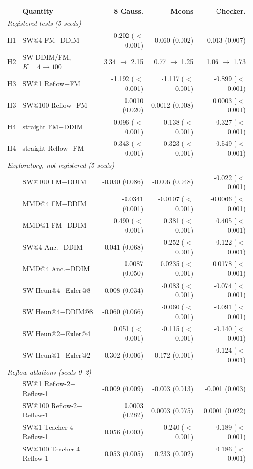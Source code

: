 \begin{tabular}{llrrr}
\toprule
 & Quantity & 8 Gauss. & Moons & Checker. \\
\midrule
\multicolumn{5}{l}{\emph{Registered tests (5 seeds)}} \\
H1 & SW@4 FM$-$DDIM & -0.202 ($<$0.001) & 0.060 (0.002) & -0.013 (0.007) \\
H2 & SW DDIM/FM, $K{=}4\to100$ & 3.34 $\to$ 2.15 & 0.77 $\to$ 1.25 & 1.06 $\to$ 1.73 \\
H3 & SW@1 Reflow$-$FM & -1.192 ($<$0.001) & -1.117 ($<$0.001) & -0.899 ($<$0.001) \\
H3 & SW@100 Reflow$-$FM & 0.0010 (0.020) & 0.0012 (0.008) & 0.0003 ($<$0.001) \\
H4 & straight FM$-$DDIM & -0.096 ($<$0.001) & -0.138 ($<$0.001) & -0.327 ($<$0.001) \\
H4 & straight Reflow$-$FM & 0.343 ($<$0.001) & 0.323 ($<$0.001) & 0.549 ($<$0.001) \\
\midrule
\multicolumn{5}{l}{\emph{Exploratory, not registered (5 seeds)}} \\
 & SW@100 FM$-$DDIM & -0.030 (0.086) & -0.006 (0.048) & -0.022 ($<$0.001) \\
 & MMD@4 FM$-$DDIM & -0.0341 (0.001) & -0.0107 ($<$0.001) & -0.0066 ($<$0.001) \\
 & MMD@1 FM$-$DDIM & 0.490 ($<$0.001) & 0.381 ($<$0.001) & 0.405 ($<$0.001) \\
 & SW@4 Anc.$-$DDIM & 0.041 (0.068) & 0.252 ($<$0.001) & 0.122 ($<$0.001) \\
 & MMD@4 Anc.$-$DDIM & 0.0087 (0.050) & 0.0235 ($<$0.001) & 0.0178 ($<$0.001) \\
 & SW Heun@4$-$Euler@8 & -0.008 (0.034) & -0.083 ($<$0.001) & -0.074 ($<$0.001) \\
 & SW Heun@4$-$DDIM@8 & -0.060 (0.066) & -0.060 ($<$0.001) & -0.091 ($<$0.001) \\
 & SW Heun@2$-$Euler@4 & 0.051 ($<$0.001) & -0.115 ($<$0.001) & -0.140 ($<$0.001) \\
 & SW Heun@1$-$Euler@2 & 0.302 (0.006) & 0.172 (0.001) & 0.124 ($<$0.001) \\
\midrule
\multicolumn{5}{l}{\emph{Reflow ablations (seeds 0--2)}} \\
 & SW@1 Reflow-2$-$Reflow-1 & -0.009 (0.009) & -0.003 (0.013) & -0.001 (0.003) \\
 & SW@100 Reflow-2$-$Reflow-1 & 0.0003 (0.282) & 0.0003 (0.075) & 0.0001 (0.022) \\
 & SW@1 Teacher-4$-$Reflow-1 & 0.056 (0.003) & 0.240 ($<$0.001) & 0.189 ($<$0.001) \\
 & SW@100 Teacher-4$-$Reflow-1 & 0.053 (0.005) & 0.233 (0.002) & 0.186 ($<$0.001) \\
\bottomrule
\end{tabular}
